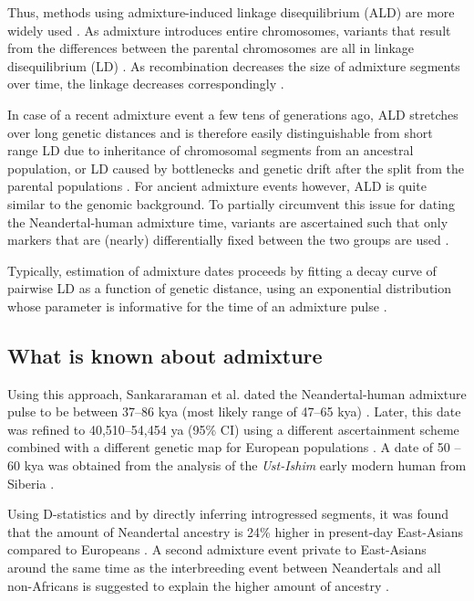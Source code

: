 \documentclass[]{article}
\begin{document}
Thus, methods using admixture-induced linkage disequilibrium (ALD) are more widely used \citep{moorjani_history_2011,sankararaman_date_2012,sankararaman_combined_2016}. As admixture introduces entire chromosomes, variants that result from the differences between the parental chromosomes are all in linkage disequilibrium (LD) \citep{chakraborty_admixture_1988,stephens_mapping_1994,wall_detecting_2000}. As recombination decreases the size of admixture segments over time, the linkage decreases correspondingly \citep{patterson_methods_2004}. 

In case of a recent admixture event a few tens of generations ago, ALD stretches  over long genetic distances and is therefore easily distinguishable from short range LD due to inheritance of chromosomal segments from an ancestral population, or LD caused by bottlenecks and genetic drift after the split from the parental populations \citep{moorjani_history_2011}. For ancient admixture events however, ALD is quite similar to the genomic background. To partially circumvent this issue for dating the Neandertal-human admixture time, variants are ascertained such that only  markers that are (nearly) differentially fixed between the two groups are used 
\citep{sankararaman_date_2012}. 

Typically, estimation of admixture dates proceeds by fitting a decay curve of pairwise LD as a function of genetic distance, using an exponential distribution whose parameter is informative for the time of an admixture pulse \citep{moorjani_history_2011,loh_inferring_2013}. 



\subsection{What is known about admixture}

Using this approach, Sankararaman et al. dated the Neandertal-human admixture pulse to be  between 37--86 kya (most likely range of 47–65 kya)  \citep{sankararaman_date_2012}. Later, this date was refined to 40,510--54,454 ya (95\% CI) using a different ascertainment scheme combined with a different genetic map for European populations \citep{moorjani_genetic_2016}. A date of 50 -- 60 kya was obtained from the analysis of the \textit{Ust-Ishim} early modern human from Siberia \citep{fu_genome_2014}.

Using D-statistics \citep{green_draft_2010} and by directly inferring introgressed segments, it was found that the amount of Neandertal ancestry is 24\% higher in present-day East-Asians compared to Europeans \citep{meyer_high-coverage_2012 ,  wall_higher_2013}. A second admixture event private to East-Asians around the same time as the interbreeding event between Neandertals and all non-Africans is suggested to explain the higher amount of ancestry \citep{kim_selection_2015,vernot_complex_2015}.
\end{document}
